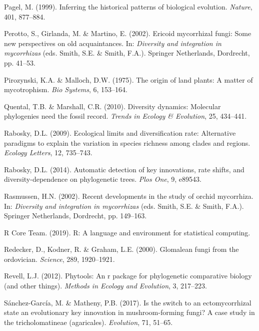 \documentclass[12pt,]{article}
\begin{document}
\leavevmode\hypertarget{ref-pagel_1999}{}%
Pagel, M. (1999). Inferring the historical patterns of biological
evolution. \emph{Nature}, 401, 877--884.

\leavevmode\hypertarget{ref-perotto_2002}{}%
Perotto, S., Girlanda, M. \& Martino, E. (2002). Ericoid mycorrhizal
fungi: Some new perspectives on old acquaintances. In: \emph{Diversity
and integration in mycorrhizas} (eds. Smith, S.E. \& Smith, F.A.).
Springer Netherlands, Dordrecht, pp. 41--53.

\leavevmode\hypertarget{ref-pirozynski_1975}{}%
Pirozynski, K.A. \& Malloch, D.W. (1975). The origin of land plants: A
matter of mycotrophism. \emph{Bio Systems}, 6, 153--164.

\leavevmode\hypertarget{ref-quental_2010}{}%
Quental, T.B. \& Marshall, C.R. (2010). Diversity dynamics: Molecular
phylogenies need the fossil record. \emph{Trends in Ecology \&
Evolution}, 25, 434--441.

\leavevmode\hypertarget{ref-rabosky_2009}{}%
Rabosky, D.L. (2009). Ecological limits and diversification rate:
Alternative paradigms to explain the variation in species richness among
clades and regions. \emph{Ecology Letters}, 12, 735--743.

\leavevmode\hypertarget{ref-rabosky_2014}{}%
Rabosky, D.L. (2014). Automatic detection of key innovations, rate
shifts, and diversity-dependence on phylogenetic trees. \emph{Plos One},
9, e89543.

\leavevmode\hypertarget{ref-rasmussen_2002}{}%
Rasmussen, H.N. (2002). Recent developments in the study of orchid
mycorrhiza. In: \emph{Diversity and integration in mycorrhizas} (eds.
Smith, S.E. \& Smith, F.A.). Springer Netherlands, Dordrecht, pp.
149--163.

\leavevmode\hypertarget{ref-rcoreteam_software_2019}{}%
R Core Team. (2019). R: A language and environment for statistical
computing.

\leavevmode\hypertarget{ref-redecker_2000}{}%
Redecker, D., Kodner, R. \& Graham, L.E. (2000). Glomalean fungi from
the ordovician. \emph{Science}, 289, 1920--1921.

\leavevmode\hypertarget{ref-revell_2012}{}%
Revell, L.J. (2012). Phytools: An r package for phylogenetic comparative
biology (and other things). \emph{Methods in Ecology and Evolution}, 3,
217--223.

\leavevmode\hypertarget{ref-snchezgarca_2017}{}%
Sánchez-García, M. \& Matheny, P.B. (2017). Is the switch to an
ectomycorrhizal state an evolutionary key innovation in mushroom-forming
fungi? A case study in the tricholomatineae (agaricales).
\emph{Evolution}, 71, 51--65.
\end{document}
